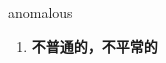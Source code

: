 
\begin{frame}
{\huge anomalous}
\begin{center}
\begin{enumerate}\Large
  \item \textbf{不普通的，不平常的}
\end{enumerate}
\end{center}
\end{frame}
